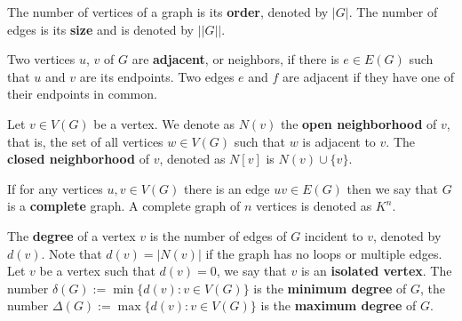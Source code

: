 
The number of vertices of a graph is its \textbf{order}, denoted by \(|G|\). The number of edges is its \textbf{size} and is denoted by \(||G||\).


Two vertices \(u\), \(v\) of \(G\) are \textbf{adjacent}, or neighbors, if there is \(e \in E(G)\) such that \(u\) and \(v\) are its endpoints. Two edges \(e\) and \(f\) are adjacent if they have one of their endpoints in common.



Let \(v \in V(G)\) be a vertex. We denote as \(N(v)\) the \textbf{open neighborhood} of \(v\), that is, the set of all vertices \(w \in V(G)\) such that \(w\) is adjacent to \(v\). The \textbf{closed neighborhood} of \(v\), denoted as \(N[v]\) is \(N(v) \cup \{v\}\).


If for any vertices \(u, v \in V(G)\) there is an edge \(uv \in E(G)\) then we say that \(G\) is a \textbf{complete} graph. A complete graph of \(n\) vertices is denoted as \(K^n\).


The \textbf{degree} of a vertex \(v\) is the number of edges of \(G\) incident to \(v\), denoted by \(d(v)\). Note that \(d(v) = |N(v)|\) if the graph has no loops or multiple edges. Let \(v\) be a vertex such that \(d(v) = 0\), we say that \(v\) is an \textbf{isolated vertex}. The number \(\delta(G) := \min \{d(v) \colon v \in V(G)\}\) is the \textbf{minimum degree} of \(G\), the number \(\Delta(G) := \max \{d(v) \colon v \in V(G)\}\) is the \textbf{maximum degree} of \(G\).

